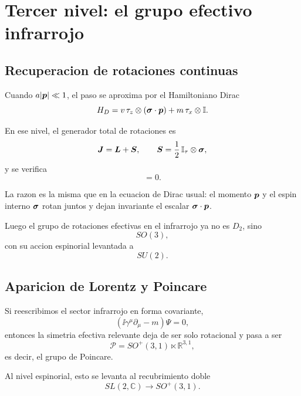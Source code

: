 \section{Tercer nivel: el grupo efectivo infrarrojo}
\subsection{Recuperacion de rotaciones continuas}
Cuando \(a|\bm{p}|\ll 1\), el paso se aproxima por el Hamiltoniano Dirac
\[
H_D=
v\,\tau_z\otimes(\bm{\sigma}\cdot\bm{p})
+m\,\tau_x\otimes\mathbb{I}.
\]

En ese nivel, el generador total de rotaciones es
\begin{equation}
\bm{J}=\bm{L}+\bm{S},
\qquad
\bm{S}=\frac{1}{2}\,\mathbb{I}_{\tau}\otimes\bm{\sigma},
\label{c25:eq:J}
\end{equation}
y se verifica
\begin{equation}
[J_i,H_D]=0.
\label{c25:eq:JH}
\end{equation}

La razon es la misma que en la ecuacion de Dirac usual: el momento \(\bm{p}\) y el espin interno \(\bm{\sigma}\) rotan juntos y dejan invariante el escalar \(\bm{\sigma}\cdot\bm{p}\).

Luego el grupo de rotaciones efectivas en el infrarrojo ya no es \(D_2\), sino
\begin{equation}
SO(3),
\end{equation}
con su accion espinorial levantada a
\begin{equation}
SU(2).
\end{equation}

\subsection{Aparicion de Lorentz y Poincare}
Si reescribimos el sector infrarrojo en forma covariante,
\begin{equation}
(\ii\gamma^\mu\partial_\mu-m)\Psi=0,
\end{equation}
entonces la simetria efectiva relevante deja de ser solo rotacional y pasa a ser
\begin{equation}
\mathcal{P}=SO^+(3,1)\ltimes\mathbb{R}^{3,1},
\end{equation}
es decir, el grupo de Poincare.

Al nivel espinorial, esto se levanta al recubrimiento doble
\begin{equation}
SL(2,\mathbb{C})\longrightarrow SO^+(3,1).
\end{equation}

